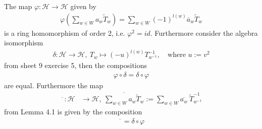 \documentclass[]{article}
\begin{document}
\begin{exercise}
    The map \(\varphi : \mathscr{H} \rightarrow \mathscr{H}\) given by
    \begin{align*}
        \varphi\left(\sum_{w \in W}^{}a_w \widetilde{T}_w\right) = \sum_{w \in W}^{}(-1)^{l(w)}\overline{a}_w\widetilde{T}_w
    \end{align*}
    is a ring homomorphism of order 2, i.e. \(\varphi^2 = id\). Furthermore consider the algebra isomorphism
    \begin{align*}
        \delta: \mathscr{H} \rightarrow \mathscr{H}, \ T_w \mapsto (-u)^{l(w)} T_{w^{-1}}^{-1}, \quad\text{where } u:= v^2
    \end{align*}
    from sheet 9 exercise 5, then the compositions 
    \begin{align*}
        \varphi \circ \delta = \delta \circ \varphi
    \end{align*}
    are equal. Furthermore the map 
    \begin{align*}
        \overline{\phantom{x}}:\mathscr{H} &\rightarrow \mathscr{H}, \ \overline{\sum_{w \in W}^{}a_w \widetilde{T}_w} := \sum_{w \in W}^{} \overline{a_w} \ \widetilde{T}_{w^{-1}}^{-1} 
    \end{align*}
    from Lemma 4.1 is given by the composition
    \begin{align*}
        \overline{\phantom{x}} = \delta \circ \varphi
    \end{align*}
\end{exercise}
\end{document}
